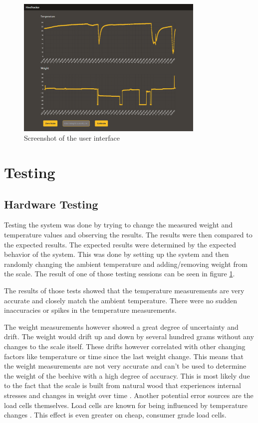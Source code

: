 \begin{figure}
    \centering
    \includegraphics[width=0.8\textwidth]{figures/user_interface.png}
    \caption{Screenshot of the user interface}
    \label{fig:user_interface}
\end{figure}

\newpage
\section{Testing}
\subsection{Hardware Testing}
Testing the system was done by trying to change the measured weight and temperature values and observing the results. The results were then compared to the expected results. The expected results were determined by the expected behavior of the system. This was done by setting up the system and then randomly changing the ambient temperature and adding/removing weight from the scale. The result of one of those testing sessions can be seen in figure \ref{fig:user_interface}.

The results of those tests showed that the temperature measurements are very accurate and closely match the ambient temperature. There were no sudden inaccuracies or spikes in the temperature measurements. 

The weight measurements however showed a great degree of uncertainty and drift. The weight would drift up and down by several hundred grams without any changes to the scale itself. These drifts however correlated with other changing factors like temperature or time since the last weight change. This means that the weight measurements are not very accurate and can't be used to determine the weight of the beehive with a high degree of accuracy. This is most likely due to the fact that the scale is built from natural wood that experiences internal stresses and changes in weight over time \cite{wood_deformation}. Another potential error sources are the load cells themselves. Load cells are known for being influenced by temperature changes \cite{loadcell_temperature}. This effect is even greater on cheap, consumer grade load cells.

